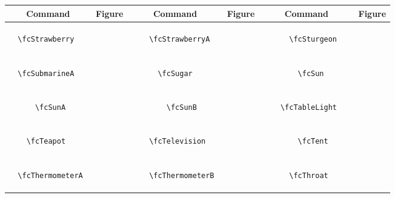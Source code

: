 \documentclass[x11names]{article}
\begin{document}
\begin{table}[H]\centering\begin{tabular}{|c|c|c|c|c|c|}\hline{\bf Command} & {\bf Figure} & {\bf Command} & {\bf Figure} & {\bf Command} & {\bf Figure}\\	\hline	&\multirow{5}{*}{	\fcStrawberry	[scale=0.64]} & &\multirow{5}{*}{	\fcStrawberryA	[scale=0.64]} & &\multirow{5}{*}{	\fcSturgeon	[scale=0.16]}\\	& & & & & \\	& & & & & \\	\verb|	\fcStrawberry	| & & \verb|	\fcStrawberryA	| & & \verb|	\fcSturgeon	| & \\	& & & & & \\	& & & & & \\	& & & & & \\	\hline									
		&\multirow{5}{*}{	\fcSubmarineA	[scale=0.16]} & &\multirow{5}{*}{	\fcSugar	[scale=0.16]} & &\multirow{5}{*}{	\fcSun	[scale=0.64]}\\	& & & & & \\	& & & & & \\	\verb|	\fcSubmarineA	| & & \verb|	\fcSugar	| & & \verb|	\fcSun	| & \\	& & & & & \\	& & & & & \\	& & & & & \\	\hline									
		&\multirow{5}{*}{	\fcSunA	[scale=0.64]} & &\multirow{5}{*}{	\fcSunB	[scale=0.64]} & &\multirow{5}{*}{	\fcTableLight	[scale=0.16]}\\	& & & & & \\	& & & & & \\	\verb|	\fcSunA	| & & \verb|	\fcSunB	| & & \verb|	\fcTableLight	| & \\	& & & & & \\	& & & & & \\	& & & & & \\	\hline									
		&\multirow{5}{*}{	\fcTeapot	[scale=0.16]} & &\multirow{5}{*}{	\fcTelevision	[scale=0.09]} & &\multirow{5}{*}{	\fcTent	[scale=0.16]}\\	& & & & & \\	& & & & & \\	\verb|	\fcTeapot	| & & \verb|	\fcTelevision	| & & \verb|	\fcTent	| & \\	& & & & & \\	& & & & & \\	& & & & & \\	\hline									
		&\multirow{5}{*}{	\fcThermometerA	[scale=0.16]} & &\multirow{5}{*}{	\fcThermometerB	[scale=0.16]} & &\multirow{5}{*}{	\fcThroat	[scale=0.16]}\\	& & & & & \\	& & & & & \\	\verb|	\fcThermometerA	| & & \verb|	\fcThermometerB	| & & \verb|	\fcThroat	| & \\	& & & & & \\	& & & & & \\	& & & & & \\	\hline									

\end{tabular}
\end{table}
\end{document}
